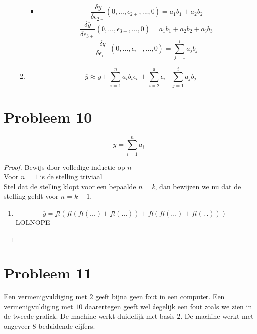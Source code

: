 \documentclass[12pt,a4paper]{article}
\begin{document}
\begin{itemize}
\begin{enumerate}
\begin{itemize}
\item
\[
\frac{\delta\overline{y}}{\delta\epsilon_{2+}}(0,...,\epsilon_{2+},...,0)
= a_1b_1 + a_2b_2
\]
\[
\frac{\delta\overline{y}}{\delta\epsilon_{3+}}(0,...,\epsilon_{3+},...,0)
= a_1b_1 + a_2b_2 + a_3b_3
\]
\[
\frac{\delta\overline{y}}{\delta\epsilon_{i+}}(0,...,\epsilon_{i+},...,0)
= \sum_{j=1}^ia_jb_j
\]

\end{itemize}

\item
\[
\overline{y} \approx y
+ \sum_{i=1}^na_ib_i\epsilon_{i.}
+ \sum_{i=2}^n\epsilon_{i+}\sum_{j=1}^ia_jb_j
\]
\end{enumerate}
\end{itemize}


\section{Probleem 10}
\[
y = \sum_{i=1}^{n}a_i
\]
\begin{proof}
Bewijs door volledige inductie op $n$\\
Voor $n=1$ is de stelling triviaal.\\
Stel dat de stelling klopt voor een bepaalde $n=k$, dan bewijzen we nu dat de stelling geldt voor $n=k+1$.\\
\begin{enumerate}[1.]
\item
\[
\overline{y} = 
fl\left(
fl\left(
fl\left(
...
\right)
+
fl\left(
...
\right)
\right)
+
fl\left(
fl\left(
...
\right)
+
fl\left(
...
\right)
\right)
\right)
\]
LOLNOPE

\end{enumerate}
\end{proof}

\section{Probleem 11}
Een vermenigvuldiging met $2$ geeft bijna geen fout in een computer. Een vermenigvuldiging met $10$ daarentegen geeft wel degelijk een fout zoals we zien in de tweede grafiek. De machine werkt duidelijk met basis $2$. De machine werkt met ongeveer $8$ beduidende cijfers.


\listoftodos
\end{document}
